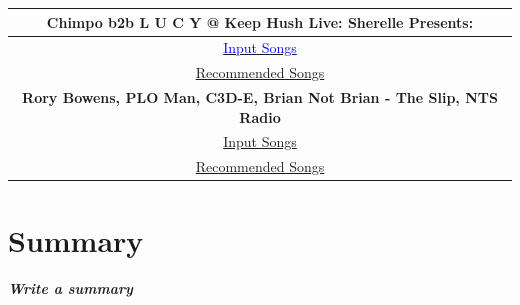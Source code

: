 \begin{center}
	\begin{tabular}{ |c|} 
		\hline
		\textbf{Chimpo b2b L U C Y @ Keep Hush Live: Sherelle Presents:}\\ 
		\hline \href{https://open.spotify.com/playlist/5bY204xBviDYYDBZQFHj6D?si=f6571fedce8f40c8}{\textcolor{blue}{Input Songs}}\\
		\hline \href{https://open.spotify.com/playlist/0a4NB3IakYdbjNZlUWrEPd?si=b6660a4adf1f4183}{Recommended Songs}\\
		\hline \textbf{Rory Bowens, PLO Man, C3D-E, Brian Not Brian - The Slip, NTS Radio}\\ 
		\hline \href{https://open.spotify.com/playlist/0i4DAcdhMWRwNui9dHnb1i?si=7ea9e25236d84162}{Input Songs}\\
		\hline \href{https://open.spotify.com/playlist/3SMcwF0GxUtV4LuXKmvypt?si=6c0b136d8a104f80}{Recommended Songs}\\
		\hline
	\end{tabular}
\end{center}

\section{Summary}
\textbf{\textit{Write a summary}}


